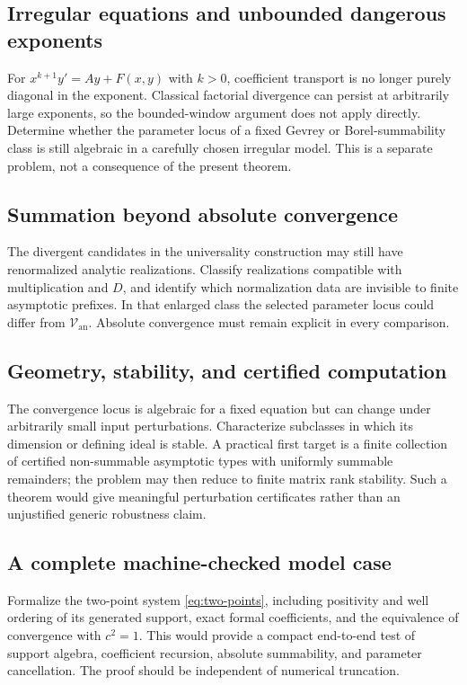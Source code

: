 \documentclass[11pt,a4paper]{article}
\numberwithin{equation}{section}
\theoremstyle{definition}
\theoremstyle{remark}
\newcommand{\cV}{\mathcal V}
\begin{document}
\subsection{Irregular equations and unbounded dangerous exponents}
For $x^{k+1}y'=Ay+F(x,y)$ with $k>0$, coefficient transport is no longer
purely diagonal in the exponent. Classical factorial divergence can
persist at arbitrarily large exponents, so the bounded-window argument
does not apply directly. Determine whether the parameter locus of a fixed
Gevrey or Borel-summability class is still algebraic in a carefully chosen
irregular model. This is a separate problem, not a consequence of the
present theorem.

\subsection{Summation beyond absolute convergence}
The divergent candidates in the universality construction may still have
renormalized analytic realizations. Classify realizations compatible with
multiplication and $D$, and identify which normalization data are invisible
to finite asymptotic prefixes. In that enlarged class the selected parameter
locus could differ from $\cV_{\mathrm{an}}$. Absolute convergence must
remain explicit in every comparison.

\subsection{Geometry, stability, and certified computation}
The convergence locus is algebraic for a fixed equation but can change
under arbitrarily small input perturbations. Characterize subclasses in
which its dimension or defining ideal is stable. A practical first target
is a finite collection of certified non-summable asymptotic types with
uniformly summable remainders; the problem may then reduce to finite matrix
rank stability. Such a theorem would give meaningful perturbation
certificates rather than an unjustified generic robustness claim.

\subsection{A complete machine-checked model case}
Formalize the two-point system \eqref{eq:two-points}, including positivity
and well ordering of its generated support, exact formal coefficients,
and the equivalence of convergence with $c^2=1$. This would provide a
compact end-to-end test of support algebra, coefficient recursion, absolute
summability, and parameter cancellation. The proof should be independent
of numerical truncation.
\end{document}
